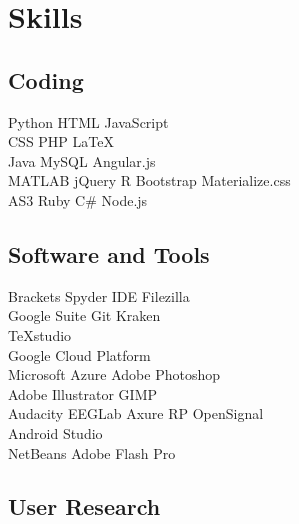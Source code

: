 \documentclass[a4paper]{deedy-resume} %
\begin{document}
\begin{minipage}[t]{0.28\textwidth} %

\section{Skills}

\subsection{Coding}

Python \textbullet{} HTML \textbullet{} JavaScript\\
CSS \textbullet{} PHP  \textbullet LaTeX\\ 
Java \textbullet{} MySQL  \textbullet{} Angular.js\\ MATLAB \textbullet{} jQuery  \textbullet{} R \textbullet{} Bootstrap \textbullet{} Materialize.css\\
AS3 \textbullet{} Ruby \textbullet{} C\#  \textbullet{} Node.js\\
\sectionspace %

\subsection{Software and Tools}

Brackets \textbullet{} Spyder IDE \textbullet{} Filezilla \\ Google Suite \textbullet{} Git Kraken\\  TeXstudio\\
Google Cloud Platform \\ Microsoft Azure \textbullet{} Adobe Photoshop \\ Adobe Illustrator \textbullet{} GIMP \\ Audacity \textbullet{}  EEGLab \textbullet{} 
Axure RP \textbullet{} OpenSignal \\  Android Studio\\
NetBeans \textbullet{} Adobe Flash Pro\\

\sectionspace %
\subsection{User Research}


\end{minipage}
\end{document}
